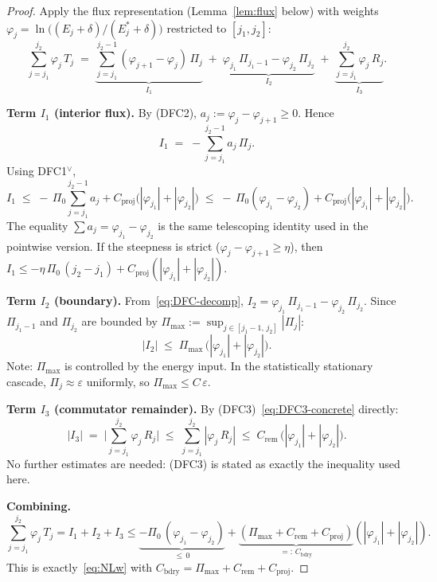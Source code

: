 \documentclass[12pt,a4paper]{article}
\theoremstyle{breakdef}
\theoremstyle{breakplain}
\theoremstyle{breakdef}
\begin{document}
\begin{proof}
Apply the flux representation (Lemma~\ref{lem:flux} below) with weights
$\varphi_j = \ln\bigl((E_j+\delta)/(E_j^*+\delta)\bigr)$
restricted to $[j_1, j_2]$:
\begin{equation}\label{eq:DFC-decomp}
  \sum_{j=j_1}^{j_2} \varphi_j\,T_j
  \;=\;
  \underbrace{\sum_{j=j_1}^{j_2-1}
    (\varphi_{j+1} - \varphi_j)\,\Pi_j}_{I_1}
  \;+\;
  \underbrace{\varphi_{j_1}\,\Pi_{j_1-1}
    - \varphi_{j_2}\,\Pi_{j_2}}_{I_2}
  \;+\;
  \underbrace{\sum_{j=j_1}^{j_2} \varphi_j\,R_j}_{I_3}.
\end{equation}

\textbf{Term $I_1$ (interior flux).}\quad
By (DFC2), $a_j:=\varphi_j-\varphi_{j+1}\ge0$. Hence
\[
  I_1
  \;=\; -\sum_{j=j_1}^{j_2-1} a_j\,\Pi_j.
\]
Using DFC1$^\vee$,
\[
  I_1
  \;\le\;
  -\,\Pi_0\sum_{j=j_1}^{j_2-1}a_j
  + C_{\mathrm{proj}}\bigl(|\varphi_{j_1}|+|\varphi_{j_2}|\bigr)
  \;\le\;
  -\,\Pi_0(\varphi_{j_1}-\varphi_{j_2})
  + C_{\mathrm{proj}}\bigl(|\varphi_{j_1}|+|\varphi_{j_2}|\bigr).
\]
The equality $\sum a_j=\varphi_{j_1}-\varphi_{j_2}$ is the same
telescoping identity used in the pointwise version.
If the steepness is strict ($\varphi_j - \varphi_{j+1} \ge \eta$),
then
$I_1 \le -\eta\,\Pi_0\,(j_2 - j_1)
+ C_{\mathrm{proj}}(|\varphi_{j_1}|+|\varphi_{j_2}|)$.

\textbf{Term $I_2$ (boundary).}\quad
From~\eqref{eq:DFC-decomp}, $I_2 = \varphi_{j_1}\,\Pi_{j_1-1}
- \varphi_{j_2}\,\Pi_{j_2}$. Since $\Pi_{j_1-1}$ and $\Pi_{j_2}$ are
bounded by $\Pi_{\max} := \sup_{j \in [j_1-1,\,j_2]}|\Pi_j|$:
\begin{equation}\label{eq:I2-bound}
  |I_2|
  \;\le\;
  \Pi_{\max}\,\bigl(|\varphi_{j_1}| + |\varphi_{j_2}|\bigr).
\end{equation}
Note: $\Pi_{\max}$ is controlled by the energy input.  In the
statistically stationary cascade, $\Pi_j \approx \varepsilon$ uniformly,
so $\Pi_{\max} \le C\,\varepsilon$.

\textbf{Term $I_3$ (commutator remainder).}\quad
By (DFC3)~\eqref{eq:DFC3-concrete} directly:
\begin{equation}\label{eq:I3-bound}
  |I_3|
  \;=\;
  \biggl|\sum_{j=j_1}^{j_2} \varphi_j\,R_j\biggr|
  \;\le\;
  \sum_{j=j_1}^{j_2} |\varphi_j\,R_j|
  \;\le\;
  C_{\mathrm{rem}}\,\bigl(|\varphi_{j_1}| + |\varphi_{j_2}|\bigr).
\end{equation}
No further estimates are needed: (DFC3) is stated as exactly the
inequality used here.

\medskip\noindent
\textbf{Combining.}\quad
\[
\sum_{j=j_1}^{j_2} \varphi_j\,T_j
= I_1 + I_2 + I_3
\le
\underbrace{-\Pi_0\,(\varphi_{j_1}-\varphi_{j_2})}_{\le\,0}
+ \underbrace{(\Pi_{\max}+C_{\mathrm{rem}}+C_{\mathrm{proj}})}_
  {=:\,C_{\mathrm{bdry}}}
  (|\varphi_{j_1}|+|\varphi_{j_2}|).
\]
This is exactly~\eqref{eq:NLw} with
$C_{\mathrm{bdry}} = \Pi_{\max} + C_{\mathrm{rem}} + C_{\mathrm{proj}}$.
\end{proof}
\end{document}
